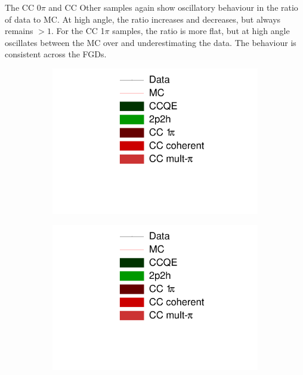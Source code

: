 The CC 0$\pi$ and CC Other samples again show oscillatory behaviour in the ratio of data to MC. At high angle, the ratio increases and decreases, but always remains $>1$. For the CC 1$\pi$ samples,  the ratio is more flat, but at high angle oscillates between the MC over and underestimating the data. The behaviour is consistent across the FGDs.

\begin{figure}[!h]
\centering
\begin{subfigure}{.24\textwidth}
  \centering
  \includegraphics[width=\linewidth, trim={5mm 60mm 30mm 0mm}, clip]{figs/legend}
\end{subfigure}
\begin{subfigure}{.24\textwidth}
  \centering
  \includegraphics[width=\linewidth, trim={5mm 0mm 30mm 80mm}, clip]{figs/legend}

\end{subfigure}
\end{figure}
